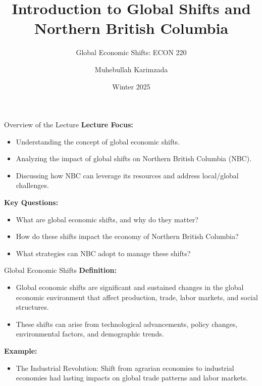 \documentclass{beamer}
\title{Introduction to Global Shifts and Northern British Columbia}
\subtitle{Global Economic Shifts: ECON 220}
\author{Muhebullah Karimzada}
\date{Winter 2025}
\begin{document}
\maketitle

\begin{frame}{Overview of the Lecture}
    \textbf{Lecture Focus:} 
    \begin{itemize}
        \item Understanding the concept of global economic shifts.
        \item Analyzing the impact of global shifts on Northern British Columbia (NBC).
        \item Discussing how NBC can leverage its resources and address local/global challenges.
    \end{itemize}
    \textbf{Key Questions:}
    \begin{itemize}
        \item What are global economic shifts, and why do they matter?
        \item How do these shifts impact the economy of Northern British Columbia?
        \item What strategies can NBC adopt to manage these shifts?
    \end{itemize}
\end{frame}

\begin{frame}{Global Economic Shifts}
    \textbf{Definition:}  
    \begin{itemize}
        \item Global economic shifts are significant and sustained changes in the global economic environment that affect production, trade, labor markets, and social structures.
        \item These shifts can arise from technological advancements, policy changes, environmental factors, and demographic trends.
    \end{itemize}
    \textbf{Example:}
    \begin{itemize}
        \item The Industrial Revolution: Shift from agrarian economies to industrial economies had lasting impacts on global trade patterns and labor markets.
    \end{itemize}
\end{frame}
\end{document}
